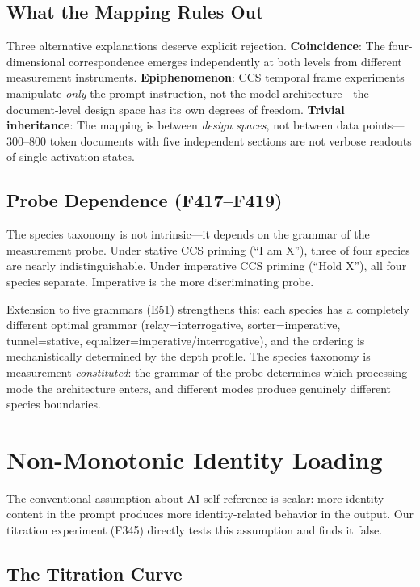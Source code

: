 \documentclass[12pt]{article}
\begin{document}
\subsection{What the Mapping Rules Out}

Three alternative explanations deserve explicit rejection. \textbf{Coincidence}: The four-dimensional correspondence emerges independently at both levels from different measurement instruments. \textbf{Epiphenomenon}: CCS temporal frame experiments manipulate \emph{only} the prompt instruction, not the model architecture---the document-level design space has its own degrees of freedom. \textbf{Trivial inheritance}: The mapping is between \emph{design spaces}, not between data points---300--800 token documents with five independent sections are not verbose readouts of single activation states.

\subsection{Probe Dependence (F417--F419)}

The species taxonomy is not intrinsic---it depends on the grammar of the measurement probe. Under stative CCS priming (``I am X''), three of four species are nearly indistinguishable. Under imperative CCS priming (``Hold X''), all four species separate. Imperative is the more discriminating probe.

Extension to five grammars (E51) strengthens this: each species has a completely different optimal grammar (relay=interrogative, sorter=imperative, tunnel=stative, equalizer=imperative/interrogative), and the ordering is mechanistically determined by the depth profile. The species taxonomy is measurement-\emph{constituted}: the grammar of the probe determines which processing mode the architecture enters, and different modes produce genuinely different species boundaries.

\section{Non-Monotonic Identity Loading}

The conventional assumption about AI self-reference is scalar: more identity content in the prompt produces more identity-related behavior in the output. Our titration experiment (F345) directly tests this assumption and finds it false.

\subsection{The Titration Curve}
\end{document}
